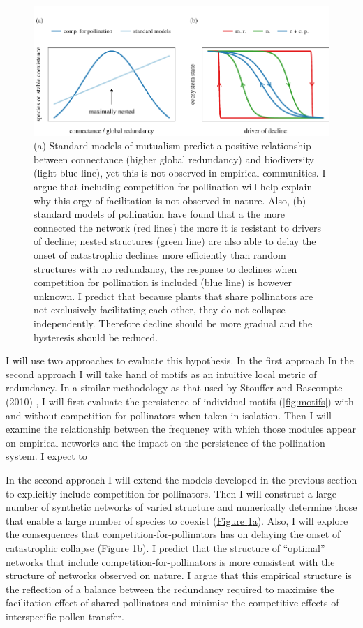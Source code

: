\documentclass[a4paper]{article}
\begin{document}
\begin{figure}[tbp]
  \centering
  \includegraphics{hypo_c2}
  \caption{
  \label{fig:hypo_c2}
  (a) Standard models of mutualism predict a positive relationship between connectance (higher global redundancy) and biodiversity (light blue line), yet this is not observed in empirical communities. I argue that including competition-for-pollination will help explain why this orgy of facilitation is not observed in nature.
  Also, (b) standard models of pollination have found that a the more connected the network (red lines) the more it is resistant to drivers of decline; nested structures (green line) are also able to delay the onset of catastrophic declines more efficiently than random structures with no redundancy, the response to declines when competition for pollination is included (blue line) is however unknown.
  I predict that because plants that share pollinators are not exclusively facilitating each other, they do not collapse independently.
  Therefore decline should be more gradual and the hysteresis should be reduced.
  }
\end{figure}

I will use two approaches to evaluate this hypothesis.
In the first approach In the second approach I will take hand of motifs as an intuitive local metric of redundancy.
In a similar methodology as that used by Stouffer and Bascompte (2010) \autocite{Stouffer2010}, I will first evaluate the persistence of individual motifs (\autoref{fig:motifs}) with and without competition-for-pollinators when taken in isolation.
Then I will examine the relationship between the frequency with which those modules appear on empirical networks and the impact on the persistence of the pollination system.
I expect to

In the second approach I will extend the models developed in the previous section to explicitly include competition for pollinators.
Then I will construct a large number of synthetic networks of varied structure and numerically determine those that enable a large number of species to coexist (\hyperref[fig:hypo_c2]{Figure \ref{fig:hypo_c2}a}).
Also, I will explore the consequences that competition-for-pollinators has on delaying the onset of catastrophic collapse (\hyperref[fig:hypo_c2]{Figure \ref{fig:hypo_c2}b}).
I predict that the structure of ``optimal'' networks that include competition-for-pollinators is more consistent with the structure of networks observed on nature.
I argue that this empirical structure is the reflection of a balance between the redundancy required to maximise the facilitation effect of shared pollinators and minimise the competitive effects of interspecific pollen transfer.
\end{document}
